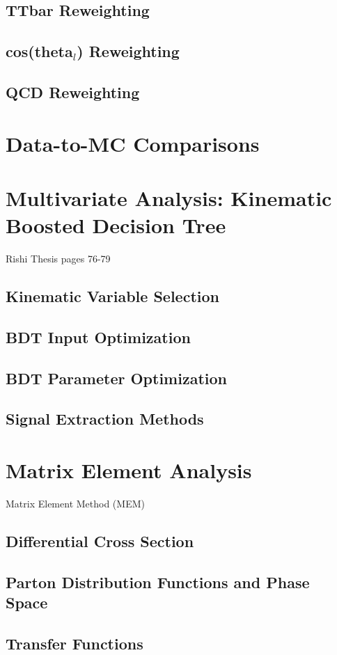\subsection{TTbar Reweighting}
\subsection{cos(theta$_l$) Reweighting}
\subsection{QCD Reweighting}

\section{Data-to-MC Comparisons}

\section{Multivariate Analysis: Kinematic Boosted Decision Tree}
Rishi Thesis pages 76-79
\subsection{Kinematic Variable Selection}
\subsection{BDT Input Optimization}
\subsection{BDT Parameter Optimization}
\subsection{Signal Extraction Methods}

\section{Matrix Element Analysis}
Matrix Element Method (MEM)
\subsection{Differential Cross Section}
\subsection{Parton Distribution Functions and Phase Space}
\subsection{Transfer Functions}
